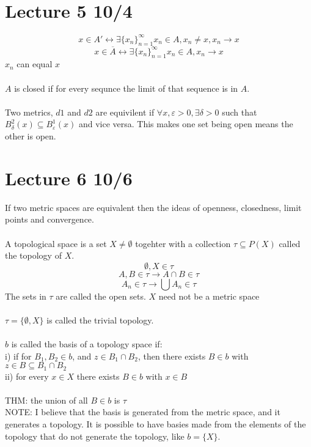 \documentclass[12pt]{article}
\begin{document}
\newpage
\section{Lecture 5 10/4}
$$x \in A' \longleftrightarrow \exists \{x_n\}_{n=1}^\infty x_n \in A, x_n \neq x, x_n \longrightarrow x$$
$$x \in \overline{A} \longleftrightarrow \exists \{x_n\}_{n=1}^\infty x_n \in A, x_n \longrightarrow x$$
$x_n$ can equal $x$\\\\ 
$A$ is closed if for every sequnce the limit of that sequence is in $A$.\\\\
Two metrics, $d1$ and $d2$ are equivilent if $\forall x, \varepsilon > 0, \exists \delta > 0$ such that $B^2_\delta(x) \subseteq B^1_\varepsilon(x)$ and vice versa. This makes one set being open means the other is open.  

\newpage
\section{Lecture 6 10/6}
If two metric spaces are equivalent then the ideas of openness, closedness, limit points and convergence. \\\\
A topological space is a set $X \neq \emptyset$ togehter with a collection $\tau \subseteq P(X)$ called the topology of $X$. $$\emptyset, X \in \tau$$
$$A,B \in \tau \longrightarrow A \cap B \in \tau$$
$$A_n \in \tau \longrightarrow \bigcup A_n \in \tau$$
The sets in $\tau$ are called the open sets. $X$ need not be a metric space\\\\
$\tau = \{\emptyset, X\}$ is called the trivial topology. \\\\
$b$ is called the basis of a topology space if: \\
i) if for $B_1, B_2 \in b$, and $z \in B_1 \cap B_2$, then there exists $B \in b$ with $z \in B \subseteq B_1 \cap B_2$\\
ii) for every $x \in X$ there exists $B \in b$ with $x \in B$\\\\
THM: the union of all $B \in b$ is $\tau$\\
NOTE: I believe that the basis is generated from the metric space, and it generates a topology. It is possible to have basies made from the elements of the topology that do not generate the topology, like $b = \{X\}$. 
\end{document}
